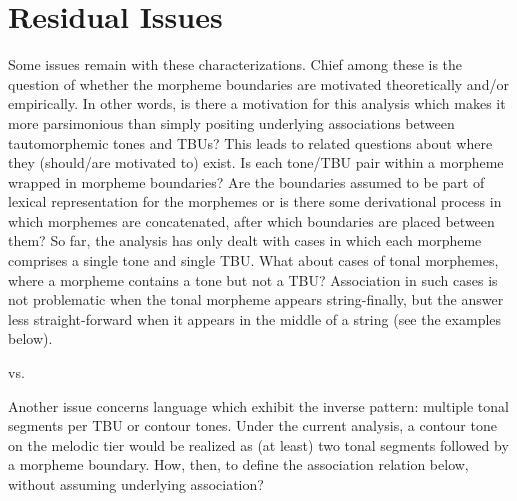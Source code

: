 \documentclass{article}
\begin{document}
\section{Residual Issues}
Some issues remain with these characterizations.  Chief among these is the question of whether the morpheme boundaries are motivated theoretically and/or empirically. In other words, is there a motivation for this analysis which makes it more parsimonious than simply positing underlying associations between tautomorphemic tones and TBUs? This leads to related questions about where they (should/are motivated to) exist. Is each tone/TBU pair within a morpheme wrapped in morpheme boundaries? Are the boundaries assumed to be part of lexical representation for the morphemes or is there some derivational process in which morphemes are concatenated, after which boundaries are placed between them?
So far, the analysis has only dealt with cases in which each morpheme comprises a single tone and single TBU. What about cases of tonal morphemes, where a morpheme contains a tone but not a TBU? Association in such cases is not problematic when the tonal morpheme appears string-finally, but the answer less straight-forward when it appears in the middle of a string (see the examples below).
\begin{center}
\hspace{1.5cm}
vs.
\hspace{1.5cm}
\end{center}
Another issue concerns language which exhibit the inverse pattern: multiple tonal segments per TBU or contour tones. Under the current analysis, a contour tone on the melodic tier would be realized as (at least) two tonal segments followed by a morpheme boundary. How, then, to define the association relation below, without assuming underlying association?
\end{document}
